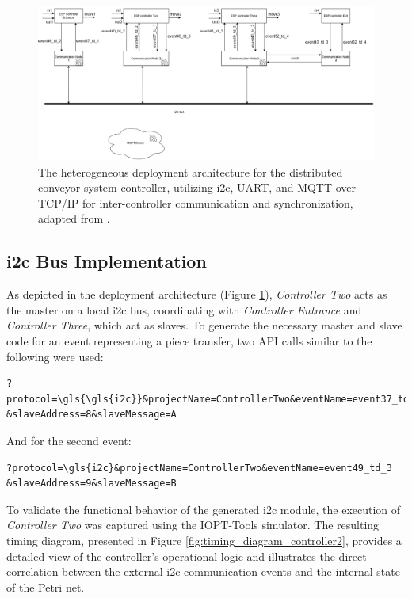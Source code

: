 \begin{figure}[htb]
    \centering
    \includegraphics[width=1\textwidth]{Chapters/Figures/prototypelayout.png}
\caption{The heterogeneous deployment architecture for the distributed conveyor system controller, utilizing \gls{i2c}, UART, and MQTT over TCP/IP for inter-controller communication and synchronization, adapted from \cite{tavaresgomes2026}.}
    \label{fig:deployment_layout}
\end{figure}


\subsection{\gls{i2c} Bus Implementation}
As depicted in the deployment architecture (Figure \ref{fig:deployment_layout}), \textit{Controller Two} acts as the master on a local \gls{i2c} bus, coordinating with \textit{Controller Entrance} and \textit{Controller Three}, which act as slaves. To generate the necessary master and slave code for an event representing a piece transfer, two API calls similar to the following were used:

\begin{verbatim}
?protocol=\gls{\gls{i2c}}&projectName=ControllerTwo&eventName=event37_td_1
&slaveAddress=8&slaveMessage=A
\end{verbatim}

And for the second event:
\begin{verbatim}
?protocol=\gls{i2c}&projectName=ControllerTwo&eventName=event49_td_3
&slaveAddress=9&slaveMessage=B
\end{verbatim}

To validate the functional behavior of the generated \gls{i2c} module, the execution of \textit{Controller Two} was captured using the IOPT-Tools simulator. The resulting timing diagram, presented in Figure \ref{fig:timing_diagram_controller2}, provides a detailed view of the controller's operational logic and illustrates the direct correlation between the external \gls{i2c} communication events and the internal state of the Petri net.  

